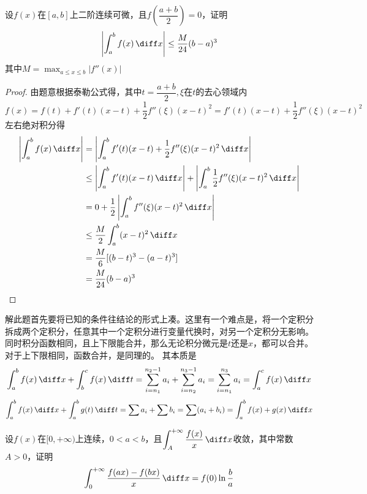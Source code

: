 \begin{example}
    设$f(x)$在$[a,b]$上二阶连续可微，且$f(\dfrac{a+b}{2})=0$，证明
    \[ \left| \int_a^bf(x)\,\diff x \right| \leq \frac{M}{24}(b-a)^3  \]
    其中$M=\max_{a\leq x \leq b}|f''(x)|$
\end{example}
\begin{proof}
    由题意根据泰勒公式得，其中$t=\dfrac{a+b}{2},\xi $在$t$的去心领域内
    \[
        f(x)  = f(t) + f'(t)(x-t)+ \frac{1}{2}f''(\xi)(x-t)^2
        = f'(t)(x-t) + \frac{1}{2}f''(\xi)(x-t)^2
    \]
    左右绝对积分得
    \begin{align*}
        \left| \int_a^bf(x)\,\diff x \right| & = \left| \int_a^bf'(t)(x-t) + \frac{1}{2}f''(\xi)(x-t)^2\,\diff x \right|                                  \\
                                             & \leq \left|\int_a^b f'(t)(x-t)\,\diff x\right| + \left|\int_a^b \frac{1}{2}f''(\xi)(x-t)^2\,\diff x\right| \\
                                             & = 0 + \frac{1}{2}\left|\int_a^b f''(\xi)(x-t)^2\,\diff x\right|                                            \\
                                             & \leq \frac{M}{2}\int_a^b (x-t)^2\,\diff x                                                                  \\
                                             & =\frac{M}{6}[(b-t)^3 - (a-t)^3]                                                                            \\
                                             & =\frac{M}{24}(b-a)^3
    \end{align*}
\end{proof}
解此题首先要将已知的条件往结论的形式上凑。这里有一个难点是，将一个定积分拆成两个定积分，任意其中一个定积分进行变量代换时，对另一个定积分无影响。
同时积分函数相同，且上下限能合并，那么无论积分微元是$t$还是$x$，都可以合并。对于上下限相同，函数合并，是同理的。
其本质是
\[
    \int_a^b f(x)\,\diff x + \int_b^c f(x)\,\diff t
    =
    \sum_{i=n_1}^{n_2-1} a_i + \sum_{i=n_2}^{n_3-1} a_i
    =
    \sum_{i=n_1}^{n_3} a_i = \int_a^c f(x)\,\diff x
\]
\[
    \int_a^b f(x)\,\diff x + \int_a^b g(t)\,\diff t
    =
    \sum a_i + \sum b_i = \sum (a_i + b_i)
    =
    \int_a^b f(x)+g(x)\,\diff x
\]
\begin{example}
    设$f(x)$在$[0,+\infty)$上连续，$0<a<b$，且$\displaystyle\int_A^{+\infty}\frac{f(x)}{x}\,\diff x$收敛，其中常数$A>0$，证明
    \[
        \int_0^{+\infty}\frac{f(ax)-f(bx)}{x}\,\diff x = f(0)\ln\frac{b}{a}
    \]
\end{example}
